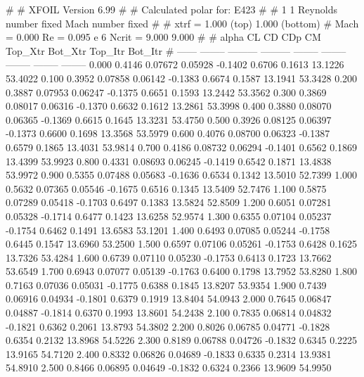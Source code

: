 #  
#       XFOIL         Version 6.99
#  
# Calculated polar for: E423                                            
#  
# 1 1 Reynolds number fixed          Mach number fixed         
#  
# xtrf =   1.000 (top)        1.000 (bottom)  
# Mach =   0.000     Re =     0.095 e 6     Ncrit =   9.000  9.000
#  
#   alpha    CL        CD       CDp       CM     Top_Xtr  Bot_Xtr  Top_Itr  Bot_Itr
#  ------ -------- --------- --------- -------- -------- -------- -------- --------
   0.000   0.4146   0.07672   0.05928  -0.1402   0.6706   0.1613  13.1226  53.4022
   0.100   0.3952   0.07858   0.06142  -0.1383   0.6674   0.1587  13.1941  53.3428
   0.200   0.3887   0.07953   0.06247  -0.1375   0.6651   0.1593  13.2442  53.3562
   0.300   0.3869   0.08017   0.06316  -0.1370   0.6632   0.1612  13.2861  53.3998
   0.400   0.3880   0.08070   0.06365  -0.1369   0.6615   0.1645  13.3231  53.4750
   0.500   0.3926   0.08125   0.06397  -0.1373   0.6600   0.1698  13.3568  53.5979
   0.600   0.4076   0.08700   0.06323  -0.1387   0.6579   0.1865  13.4031  53.9814
   0.700   0.4186   0.08732   0.06294  -0.1401   0.6562   0.1869  13.4399  53.9923
   0.800   0.4331   0.08693   0.06245  -0.1419   0.6542   0.1871  13.4838  53.9972
   0.900   0.5355   0.07488   0.05683  -0.1636   0.6534   0.1342  13.5010  52.7399
   1.000   0.5632   0.07365   0.05546  -0.1675   0.6516   0.1345  13.5409  52.7476
   1.100   0.5875   0.07289   0.05418  -0.1703   0.6497   0.1383  13.5824  52.8509
   1.200   0.6051   0.07281   0.05328  -0.1714   0.6477   0.1423  13.6258  52.9574
   1.300   0.6355   0.07104   0.05237  -0.1754   0.6462   0.1491  13.6583  53.1201
   1.400   0.6493   0.07085   0.05244  -0.1758   0.6445   0.1547  13.6960  53.2500
   1.500   0.6597   0.07106   0.05261  -0.1753   0.6428   0.1625  13.7326  53.4284
   1.600   0.6739   0.07110   0.05230  -0.1753   0.6413   0.1723  13.7662  53.6549
   1.700   0.6943   0.07077   0.05139  -0.1763   0.6400   0.1798  13.7952  53.8280
   1.800   0.7163   0.07036   0.05031  -0.1775   0.6388   0.1845  13.8207  53.9354
   1.900   0.7439   0.06916   0.04934  -0.1801   0.6379   0.1919  13.8404  54.0943
   2.000   0.7645   0.06847   0.04887  -0.1814   0.6370   0.1993  13.8601  54.2438
   2.100   0.7835   0.06814   0.04832  -0.1821   0.6362   0.2061  13.8793  54.3802
   2.200   0.8026   0.06785   0.04771  -0.1828   0.6354   0.2132  13.8968  54.5226
   2.300   0.8189   0.06788   0.04726  -0.1832   0.6345   0.2225  13.9165  54.7120
   2.400   0.8332   0.06826   0.04689  -0.1833   0.6335   0.2314  13.9381  54.8910
   2.500   0.8466   0.06895   0.04649  -0.1832   0.6324   0.2366  13.9609  54.9950
